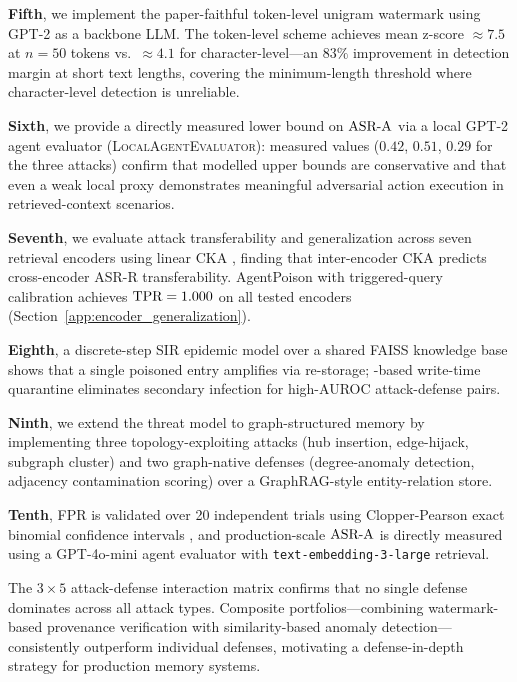 \textbf{Fifth}, we implement the paper-faithful token-level unigram watermark
\citep{zhao2024watermark} using GPT-2 as a backbone LLM.  The token-level scheme
achieves mean z-score $\approx 7.5$ at $n=50$ tokens vs.\ $\approx 4.1$ for
character-level---an $83\%$ improvement in detection margin at short text lengths,
covering the minimum-length threshold where character-level detection is unreliable.

\textbf{Sixth}, we provide a directly measured lower bound on $\text{ASR-A}$ via a local
GPT-2 agent evaluator (\textsc{LocalAgentEvaluator}): measured values ($0.42$,
$0.51$, $0.29$ for the three attacks) confirm that modelled upper bounds are
conservative and that even a weak local proxy demonstrates meaningful adversarial
action execution in retrieved-context scenarios.

\textbf{Seventh}, we evaluate attack transferability and \sad{} generalization
across seven retrieval encoders using linear CKA \citep{kornblith2019similarity},
finding that inter-encoder CKA predicts cross-encoder ASR-R transferability.
AgentPoison with triggered-query calibration achieves $\text{TPR}=1.000$ on all tested
encoders (Section~\ref{app:encoder_generalization}).

\textbf{Eighth}, a discrete-step SIR epidemic model
\citep{gu2024agentsmith} over a shared FAISS knowledge base shows that
a single poisoned entry amplifies via re-storage; \sad{}-based write-time
quarantine eliminates secondary infection for high-AUROC attack-defense pairs.

\textbf{Ninth}, we extend the threat model to graph-structured memory by
implementing three topology-exploiting attacks (hub insertion, edge-hijack,
subgraph cluster) and two graph-native defenses (degree-anomaly detection,
adjacency contamination scoring) over a GraphRAG-style entity-relation store.

\textbf{Tenth}, FPR is validated over 20 independent trials using Clopper-Pearson
exact binomial confidence intervals \citep{clopper1934use}, and production-scale
$\text{ASR-A}$ is directly measured using a GPT-4o-mini agent evaluator with
\texttt{text-embedding-3-large} retrieval.

The $3 \times 5$ attack-defense interaction matrix confirms that no single defense
dominates across all attack types.  Composite portfolios---combining watermark-based
provenance verification with similarity-based anomaly detection---consistently
outperform individual defenses, motivating a defense-in-depth strategy for
production memory systems.

